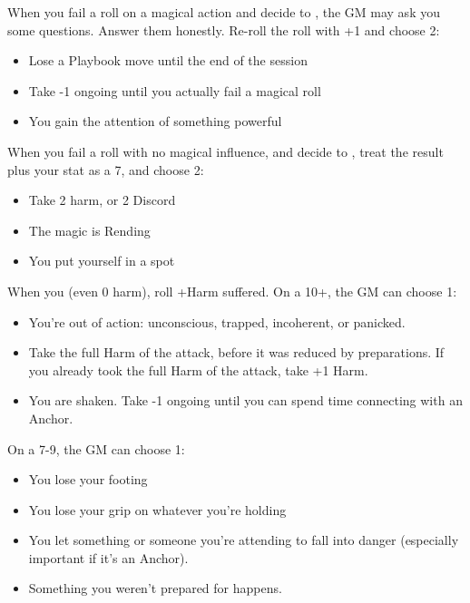 



\begin{multicols}{3}
  \begin{move}
    When you fail a roll on a magical action and decide to , the GM may ask you some
    questions. Answer them honestly. Re-roll the roll with +1 and choose
    2:
    \begin{itemize}
      \setlength\itemsep{0em}
    \item Lose a Playbook move until the end of the session
    \item Take -1 ongoing until you actually fail a magical roll
    \item You gain the attention of something powerful
    \end{itemize}
  \end{move}

  \SEPARATOR
  
  \begin{move}
    When you fail a roll with no magical influence, and decide to
    , treat the result plus your stat as a
    7, and choose 2:
    \begin{itemize}
      \setlength\itemsep{0em}
    \item Take 2 harm, or 2 Discord
    \item The magic is Rending
    \item You put yourself in a spot
    \end{itemize}
  \end{move}

  \SEPARATOR

  \begin{move}
    When you  (even 0 harm), roll +Harm suffered. On a 10+, the GM can choose 1:
    \begin{itemize}
      \setlength\itemsep{0em}
    \item You're out of action: unconscious, trapped, incoherent, or
      panicked.
    \item Take the full Harm of the attack, before it was reduced by
      preparations. If you already took the full Harm of the attack, take
      +1 Harm.
    \item You are shaken. Take -1 ongoing until you can spend time
      connecting with an Anchor.
    \end{itemize}
    On a 7-9, the GM can choose 1:
    \begin{itemize}
      \setlength\itemsep{0em}
    \item You lose your footing
    \item You lose your grip on whatever you're holding
    \item You let something or someone you're attending to fall into
      danger (especially important if it's an Anchor).
    \item Something you weren't prepared for happens.
    \end{itemize}
    

\end{move}
\end{multicols}
